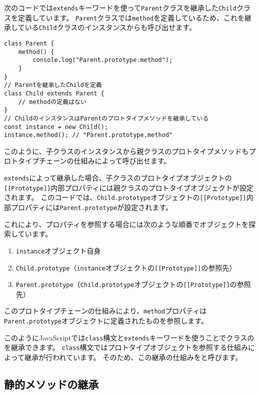 次のコードでは\texttt{extends}キーワードを使って\texttt{Parent}クラスを継承した\texttt{Child}クラスを定義しています。
\texttt{Parent}クラスでは\texttt{method}を定義しているため、これを継承している\texttt{Child}クラスのインスタンスからも呼び出せます。

\begin{lstlisting}
class Parent {
    method() {
        console.log("Parent.prototype.method");
    }
}
// Parentを継承したChildを定義
class Child extends Parent {
    // methodの定義はない
}
// ChildのインスタンスはParentのプロトタイプメソッドを継承している
const instance = new Child();
instance.method(); // "Parent.prototype.method"
\end{lstlisting}

このように、子クラスのインスタンスから親クラスのプロトタイプメソッドもプロトタイプチェーンの仕組みによって呼び出せます。

\texttt{extends}によって継承した場合、子クラスのプロトタイプオブジェクトの\texttt{[[Prototype]]}内部プロパティには親クラスのプロトタイプオブジェクトが設定されます。
このコードでは、\texttt{Child.prototype}オブジェクトの\texttt{[[Prototype]]}内部プロパティには\texttt{Parent.prototype}が設定されます。

これにより、プロパティを参照する場合には次のような順番でオブジェクトを探索しています。

\begin{enumerate}
\def\labelenumi{\arabic{enumi}.}
\item
  \texttt{instance}オブジェクト自身
\item
  \texttt{Child.prototype}（\texttt{instance}オブジェクトの\texttt{[[Prototype]]}の参照先）
\item
  \texttt{Parent.prototype}（\texttt{Child.prototype}オブジェクトの\texttt{[[Prototype]]}の参照先）
\end{enumerate}

このプロトタイプチェーンの仕組みにより、\texttt{method}プロパティは\texttt{Parent.prototype}オブジェクトに定義されたものを参照します。

このようにJavaScriptでは\texttt{class}構文と\texttt{extends}キーワードを使うことでクラスの\textbf{}を継承できます。
\texttt{class}構文ではプロトタイプオブジェクトを参照する仕組みによって継承が行われています。
そのため、この継承の仕組みを\textbf{}と呼びます。

\hypertarget{static-inheritance}{%
\subsection{静的メソッドの継承}\label{static-inheritance}}

